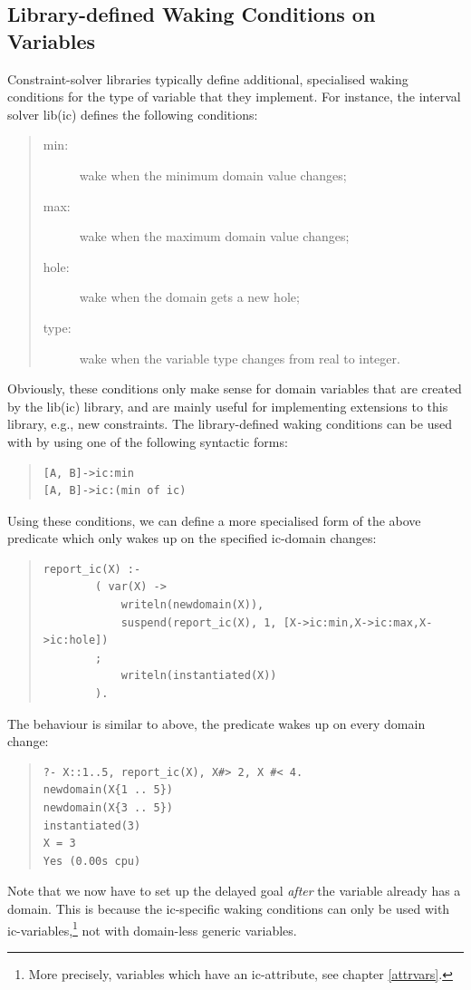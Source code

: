 {%
\subsection{Library-defined Waking Conditions on Variables}

Constraint-solver libraries typically define additional, specialised
waking conditions for the type of variable that they implement.
For instance, the interval solver lib(ic) defines the following
conditions:
\begin{quote}
\begin{description}
\item[min:] wake when the minimum domain value changes;
\item[max:] wake when the maximum domain value changes;
\item[hole:] wake when the domain gets a new hole;
\item[type:] wake when the variable type changes from real to integer.
\end{description}
\end{quote}
Obviously, these conditions only make sense for domain variables
that are created by the lib(ic) library, and are mainly useful for
implementing extensions to this library, e.g., new constraints.
The library-defined waking conditions can be used with
by using one of the following syntactic forms:
\begin{quote}
\begin{verbatim}
[A, B]->ic:min
[A, B]->ic:(min of ic)
\end{verbatim}
\end{quote}
Using these conditions, we can define a more specialised form of
the above  predicate which only wakes up on the specified
ic-domain changes:
\begin{quote}
\begin{verbatim}
report_ic(X) :-
        ( var(X) ->
            writeln(newdomain(X)),
            suspend(report_ic(X), 1, [X->ic:min,X->ic:max,X->ic:hole])
        ;
            writeln(instantiated(X))
        ).
\end{verbatim}
\end{quote}
The behaviour is similar to above, the predicate wakes up on every
domain change:
\begin{quote}
\begin{verbatim}
?- X::1..5, report_ic(X), X#> 2, X #< 4.
newdomain(X{1 .. 5})
newdomain(X{3 .. 5})
instantiated(3)
X = 3
Yes (0.00s cpu)
\end{verbatim}
\end{quote}
Note that we now have to set up the delayed goal \emph{after} the
variable already has a domain. This is because the ic-specific waking
conditions can only be used with ic-variables,\footnote{%
  More precisely,
  variables which have an ic-attribute, see chapter \ref{attrvars}.}
not with domain-less generic variables.



}

